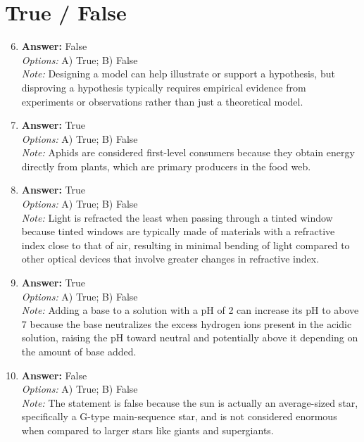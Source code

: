 \documentclass[12pt]{article}
\begin{document}
\section*{True / False}
\begin{enumerate}[label=\arabic*.]
\setcounter{enumi}{5}
\item \textbf{Answer:} False
\\ \textit{Options:} A) True; B) False
\\ \textit{Note:} Designing a model can help illustrate or support a hypothesis, but disproving a hypothesis typically requires empirical evidence from experiments or observations rather than just a theoretical model.
\item \textbf{Answer:} True
\\ \textit{Options:} A) True; B) False
\\ \textit{Note:} Aphids are considered first-level consumers because they obtain energy directly from plants, which are primary producers in the food web.
\item \textbf{Answer:} True
\\ \textit{Options:} A) True; B) False
\\ \textit{Note:} Light is refracted the least when passing through a tinted window because tinted windows are typically made of materials with a refractive index close to that of air, resulting in minimal bending of light compared to other optical devices that involve greater changes in refractive index.
\item \textbf{Answer:} True
\\ \textit{Options:} A) True; B) False
\\ \textit{Note:} Adding a base to a solution with a pH of 2 can increase its pH to above 7 because the base neutralizes the excess hydrogen ions present in the acidic solution, raising the pH toward neutral and potentially above it depending on the amount of base added.
\item \textbf{Answer:} False
\\ \textit{Options:} A) True; B) False
\\ \textit{Note:} The statement is false because the sun is actually an average-sized star, specifically a G-type main-sequence star, and is not considered enormous when compared to larger stars like giants and supergiants.
\end{enumerate}
\end{document}
